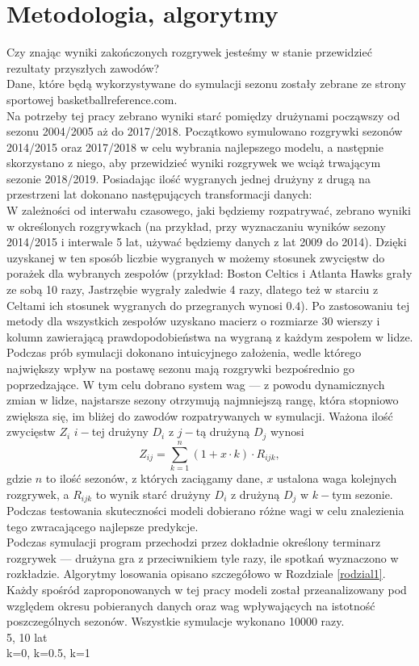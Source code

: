 \documentclass[inzynierska]{pwr_wmat_praca_dyplomowa}
\theoremstyle{plain}
\numberwithin{theorem}{chapter}
\theoremstyle{definition}
\numberwithin{theorem}{chapter}
\begin{document}
\chapter{Metodologia, algorytmy}\label{rodzial_algorytmy}
Czy znając wyniki zakończonych rozgrywek jesteśmy w stanie przewidzieć rezultaty przyszłych zawodów?
\\
Dane, które będą wykorzystywane do symulacji sezonu zostały zebrane ze strony sportowej basketballreference.com.
\\
Na potrzeby tej pracy zebrano wyniki starć pomiędzy drużynami począwszy od sezonu 2004/2005 aż do 2017/2018. Początkowo symulowano rozgrywki sezonów 2014/2015 oraz 2017/2018 w celu wybrania najlepszego modelu, a następnie skorzystano z niego, aby przewidzieć wyniki rozgrywek we wciąż trwającym sezonie 2018/2019.
Posiadając ilość wygranych jednej drużyny z drugą na przestrzeni lat dokonano następujących transformacji danych:
\\
W zależności od interwału czasowego, jaki będziemy rozpatrywać, zebrano wyniki w określonych rozgrywkach (na przykład, przy wyznaczaniu wyników sezony 2014/2015 i interwale 5 lat, używać będziemy danych z lat 2009 do 2014). Dzięki uzyskanej w ten sposób liczbie wygranych w możemy stosunek zwycięstw do porażek dla wybranych zespołów (przykład: Boston Celtics i Atlanta Hawks grały ze sobą 10 razy, Jastrzębie wygrały zaledwie 4 razy, dlatego też w starciu z Celtami ich stosunek wygranych do przegranych wynosi $0.4$). Po zastosowaniu tej metody dla wszystkich zespołów uzyskano macierz o rozmiarze 30 wierszy i kolumn zawierającą prawdopodobieństwa na wygraną z każdym zespołem w lidze.
\\
Podczas prób symulacji dokonano intuicyjnego założenia, wedle którego największy wpływ na postawę sezonu mają rozgrywki bezpośrednio go poprzedzające. W tym celu dobrano system wag --- z powodu dynamicznych zmian w lidze, najstarsze sezony otrzymują najmniejszą rangę, która stopniowo zwiększa się, im bliżej do zawodów rozpatrywanych w symulacji. Ważona ilość zwycięstw $Z_i$ $i-$tej drużyny $D_i$ z $j-$tą drużyną $D_j$ wynosi
\begin{equation}
	Z_{ij} = \sum_{k=1}^{n} (1+x\cdot k)\cdot R_{ijk}, 
\end{equation}
gdzie $n$ to ilość sezonów, z których zaciągamy dane, $x$ ustalona waga kolejnych rozgrywek, a $R_{ijk}$ to wynik starć drużyny $D_i$ z drużyną $D_j$ w $k-$tym sezonie. Podczas testowania skuteczności modeli dobierano różne wagi w celu znalezienia tego zwracającego najlepsze predykcje.    
\\
Podczas symulacji program przechodzi przez dokładnie określony terminarz rozgrywek --- drużyna gra z przeciwnikiem tyle razy, ile spotkań wyznaczono w rozkładzie. Algorytmy losowania opisano szczegółowo w Rozdziale \ref{rodzial1}.
\\
Każdy spośród zaproponowanych w tej pracy modeli został przeanalizowany pod względem okresu pobieranych danych oraz wag wpływających na istotność poszczególnych sezonów. Wszystkie symulacje wykonano 10000 razy.
\\
5, 10 lat
\\
k=0, k=0.5, k=1
\end{document}

